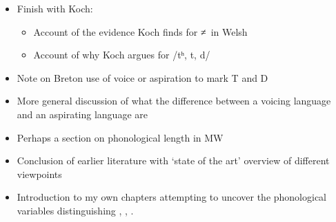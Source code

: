 \begin{itemize}
\item Finish with Koch:
  \begin{itemize}
  \item Account of the evidence Koch finds for \lT≠\xD\ in Welsh
  \item Account of why Koch argues for /tʰ, t, d/
  \end{itemize}
\item Note on Breton use of voice or aspiration to mark T and D
\item More general discussion of what the difference between a voicing language and an aspirating language are
\item Perhaps a section on phonological length in MW

\item Conclusion of earlier literature with `state of the art' \ie overview of different viewpoints
\item Introduction to my own chapters attempting to uncover the phonological variables distinguishing \xT, \lT, \xD.
\end{itemize}


